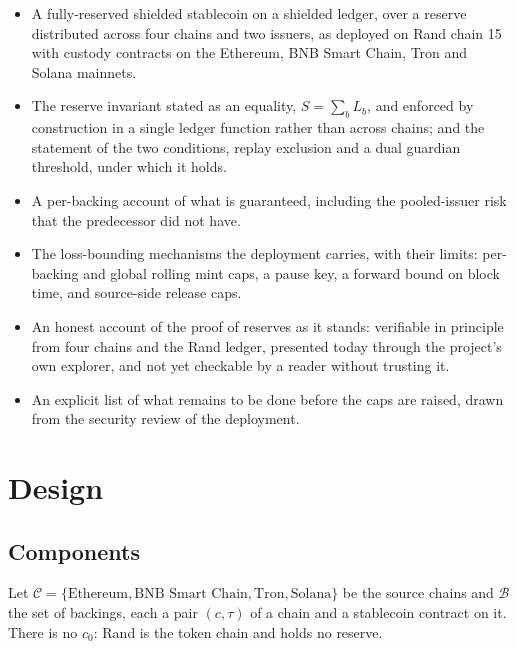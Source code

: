 \documentclass[11pt,a4paper]{article}
\begin{document}
\begin{itemize}
    \item A fully-reserved shielded stablecoin on a shielded ledger, over a reserve distributed across four chains and two issuers, as deployed on Rand chain 15 with custody contracts on the Ethereum, BNB Smart Chain, Tron and Solana mainnets.
    \item The reserve invariant stated as an equality, $S = \sum_b L_b$, and enforced by construction in a single ledger function rather than across chains; and the statement of the two conditions, replay exclusion and a dual guardian threshold, under which it holds.
    \item A per-backing account of what is guaranteed, including the pooled-issuer risk that the predecessor did not have.
    \item The loss-bounding mechanisms the deployment carries, with their limits: per-backing and global rolling mint caps, a pause key, a forward bound on block time, and source-side release caps.
    \item An honest account of the proof of reserves as it stands: verifiable in principle from four chains and the Rand ledger, presented today through the project's own explorer, and not yet checkable by a reader without trusting it.
    \item An explicit list of what remains to be done before the caps are raised, drawn from the security review of the deployment.
\end{itemize}

\section{Design}
\label{sec:design}

\subsection{Components}

Let $\mathcal{C} = \{\text{Ethereum}, \text{BNB Smart Chain}, \text{Tron}, \text{Solana}\}$ be the source chains and $\mathcal{B}$ the set of backings, each a pair $(c, \tau)$ of a chain and a stablecoin contract on it. There is no $c_0$: Rand is the token chain and holds no reserve.
\end{document}
